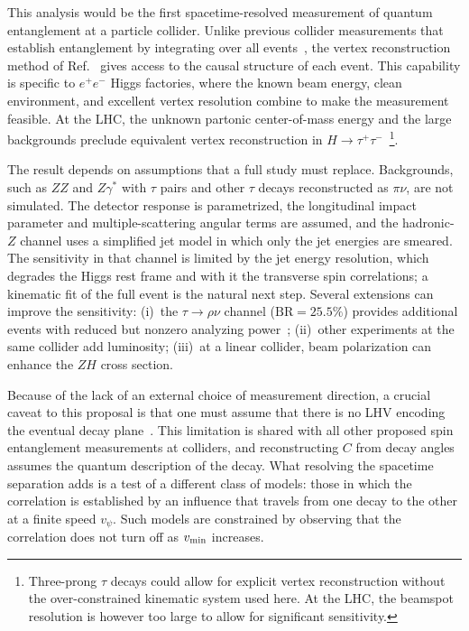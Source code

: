 \documentclass[%
 reprint,
 amsmath,amssymb,
 aps
]{revtex4-2}
\newcommand{\ee}{e^+e^-}
\newcommand{\tautau}{\tau^+\tau^-}
\newcommand{\Htautau}{H\!\to\!\tautau}
\newcommand{\vpsi}{v_\psi}
\newcommand{\vmin}{v_{\rm min}}
\begin{document}
This analysis would be the first spacetime-resolved measurement of quantum entanglement at a particle collider. Unlike previous collider measurements that establish entanglement by integrating over all events~\cite{ATLAS:2023fsd,CMS:2024pts}, the vertex reconstruction method of Ref.~\cite{Jeans_2016} gives access to the causal structure of each event. This capability is specific to $\ee$ Higgs factories, where the known beam energy, clean environment, and excellent vertex resolution combine to make the measurement feasible. At the LHC, the unknown partonic center-of-mass energy and the large backgrounds preclude equivalent vertex reconstruction in $\Htautau$~\footnote{Three-prong $\tau$ decays could allow for explicit vertex reconstruction without the over-constrained kinematic system used here. At the LHC, the beamspot resolution is however too large to allow for significant sensitivity.}.

The result depends on assumptions that a full study must replace. Backgrounds, such as $ZZ$ and $Z\gamma^*$ with $\tau$ pairs and other $\tau$ decays reconstructed as $\pi\nu$, are not simulated. The detector response is parametrized, the longitudinal impact parameter and multiple-scattering angular terms are assumed, and the hadronic-$Z$ channel uses a simplified jet model in which only the jet energies are smeared. The sensitivity in that channel is limited by the jet energy resolution, which degrades the Higgs rest frame and with it the transverse spin correlations; a kinematic fit of the full event is the natural next step. Several extensions can improve the sensitivity: (i)~the $\tau\to\rho\nu$ channel ($\mathrm{BR}=25.5\%$) provides additional events with reduced but nonzero analyzing power~\cite{Tsai:1971vv}; (ii)~other experiments at the same collider add luminosity; (iii)~at a linear collider, beam polarization can enhance the $ZH$ cross section.

Because of the lack of an external choice of measurement direction, a crucial caveat to this proposal is that one must assume that there is no LHV encoding the eventual decay plane~\cite{Abel:1992kz,Dreiner:1992gt,Abel:2025skj,Bechtle:2025ugc}. This limitation is shared with all other proposed spin entanglement measurements at colliders, and reconstructing $C$ from decay angles assumes the quantum description of the decay. What resolving the spacetime separation adds is a test of a different class of models: those in which the correlation is established by an influence that travels from one decay to the other at a finite speed $\vpsi$. Such models are constrained by observing that the correlation does not turn off as $\vmin$ increases.
\end{document}
